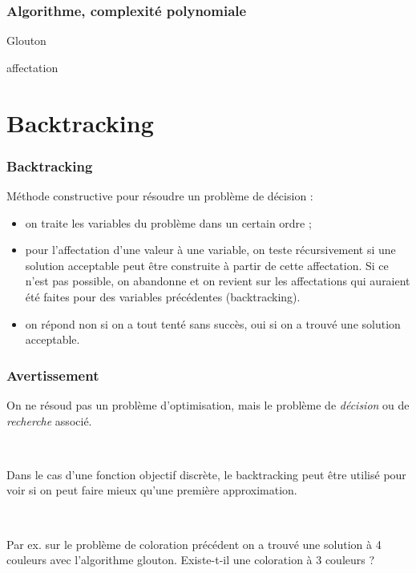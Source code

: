 \documentclass{beamer}
\begin{document}
\begin{frame}
  \frametitle{Algorithme, complexité polynomiale}

 \begin{algorithm}[H]
  \caption{Glouton}
  \label{alg:glouton}
  \Return affectation
 \end{algorithm}
  
\end{frame}

\section{Backtracking}

\begin{frame}
  \frametitle{Backtracking}

  Méthode constructive pour résoudre un problème de décision :
  \begin{itemize}
  \item on traite les variables du problème dans un certain ordre ;
  \item pour l'affectation d'une valeur à une variable, on teste récursivement si une solution acceptable peut être construite à partir de cette affectation. Si ce n'est pas possible, on abandonne et on revient sur les affectations qui auraient été faites pour des variables précédentes (backtracking).
  \item on répond non si on a tout tenté sans succès, oui si on a trouvé une solution acceptable. 
  \end{itemize}
  
\end{frame}

\begin{frame}
  \frametitle{Avertissement}

  On ne résoud pas un problème d'optimisation, mais le problème de \emph{décision}
  ou de \emph{recherche} associé.

  ~

  Dans le cas d'une fonction objectif discrète, le backtracking peut être
  utilisé pour voir si on peut faire mieux qu'une première approximation.

  ~
  
  Par ex. sur le problème de coloration précédent on a trouvé une solution
  à 4 couleurs avec l'algorithme glouton. Existe-t-il une coloration à 3 couleurs ?
  
\end{frame}
\end{document}
